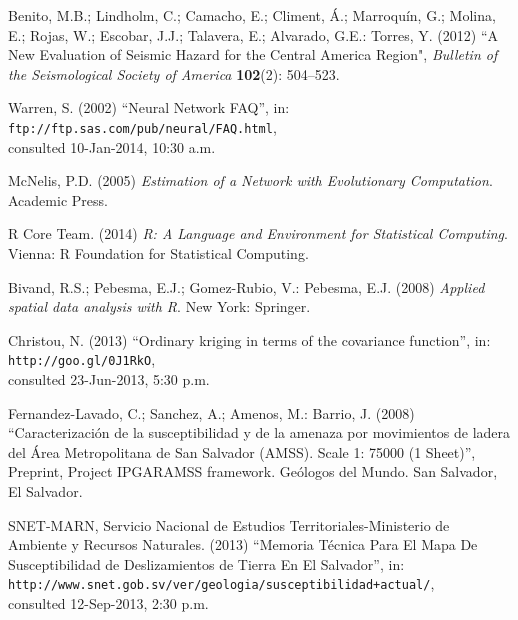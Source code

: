 \documentclass[11pt,twoside]{rmta2010eng}%
\begin{document}
\begin{thebibliography}{99}
Benito, M.B.; Lindholm, C.; Camacho, E.; Climent, \'{A}.; Marroqu\'{i}n, G.; Molina, E.; Rojas, W.; Escobar, J.J.; Talavera, E.; Alvarado, G.E.: Torres, Y. (2012)
``A New Evaluation of Seismic Hazard for the Central America Region", 
{\it Bulletin of the Seismological Society of America} {\bf 102}(2): 504--523.





Warren, S. (2002) 
``Neural Network FAQ'',
in:\\ {\tt ftp://ftp.sas.com/pub/neural/FAQ.html},\\
consulted 10-Jan-2014, 10:30 a.m.





McNelis, P.D. (2005)
{\it Estimation of a Network with Evolutionary Computation}. 
Academic Press.


R Core Team. (2014)
{\it R: A Language and Environment for Statistical Computing}. 
Vienna: R Foundation for Statistical Computing.




Bivand, R.S.; Pebesma, E.J.; Gomez-Rubio, V.: Pebesma, E.J. (2008)
{\it Applied spatial data analysis with R}. 
New York: Springer.



Christou, N. (2013)
``Ordinary kriging in terms of the covariance function'',
in:\\ {\tt http://goo.gl/0J1RkO},\\
consulted 23-Jun-2013, 5:30 p.m.




Fernandez-Lavado, C.; Sanchez, A.; Amenos, M.: Barrio, J. (2008)
``Caracterizaci\'{o}n de la susceptibilidad y de la amenaza por movimientos de ladera del \'{A}rea Metropolitana de San Salvador (AMSS). Scale 1: 75000 (1 Sheet)'',
Preprint, Project IPGARAMSS framework. Ge\'{o}logos del Mundo. San Salvador, El Salvador.



SNET-MARN, Servicio Nacional de Estudios Territoriales-Ministerio de Ambiente y Recursos Naturales. (2013) 
``Memoria T\'{e}cnica Para El Mapa De Susceptibilidad de Deslizamientos de Tierra En El Salvador'',
in:\\ {\tt http://www.snet.gob.sv/ver/geologia/susceptibilidad+actual/},\\
consulted 12-Sep-2013, 2:30 p.m.





\end{thebibliography}
\end{document}
